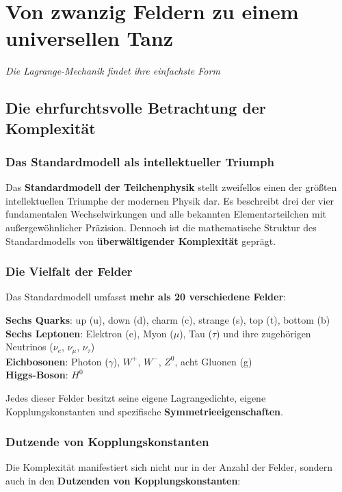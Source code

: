 \documentclass[12pt,a4paper]{report}
\begin{document}
	\chapter{Von zwanzig Feldern zu einem universellen Tanz}
	\textit{Die Lagrange-Mechanik findet ihre einfachste Form}
	
	\section{Die ehrfurchtsvolle Betrachtung der Komplexität}
	
	\subsection{Das Standardmodell als intellektueller Triumph}
	
	Das \textbf{Standardmodell der Teilchenphysik} stellt zweifellos einen der größten intellektuellen Triumphe der modernen Physik dar. Es beschreibt drei der vier fundamentalen Wechselwirkungen und alle bekannten Elementarteilchen mit außergewöhnlicher Präzision. Dennoch ist die mathematische Struktur des Standardmodells von \textbf{überwältigender Komplexität} geprägt.
	
	\subsection{Die Vielfalt der Felder}
	
	Das Standardmodell umfasst \textbf{mehr als 20 verschiedene Felder}:
	
	\textbf{Sechs Quarks}: up (u), down (d), charm (c), strange (s), top (t), bottom (b)\\
	\textbf{Sechs Leptonen}: Elektron (e), Myon ($\mu$), Tau ($\tau$) und ihre zugehörigen Neutrinos ($\nu_e$, $\nu_\mu$, $\nu_\tau$)\\
	\textbf{Eichbosonen}: Photon ($\gamma$), $W^+$, $W^-$, $Z^0$, acht Gluonen (g)\\
	\textbf{Higgs-Boson}: $H^0$
	
	Jedes dieser Felder besitzt seine eigene Lagrangedichte, eigene Kopplungskonstanten und spezifische \textbf{Symmetrieeigenschaften}.
	
	\subsection{Dutzende von Kopplungskonstanten}
	
	Die Komplexität manifestiert sich nicht nur in der Anzahl der Felder, sondern auch in den \textbf{Dutzenden von Kopplungskonstanten}:
	
\end{document}
